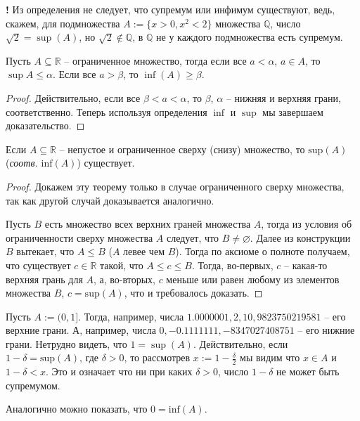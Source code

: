 \begin{mydanger}{\bf{!}}
    Из определения не следует, что супремум или инфимум существуют, ведь, скажем, для подмножества $A:= \{x>0, x^2 < 2\}$ множества $\mathbb{Q}$, число $\sqrt{2} = \sup (A)$, но $\sqrt{2} \notin \mathbb{Q}$, \ie в $\mathbb{Q}$ не у каждого подмножества есть супремум.
\end{mydanger}

\begin{lemma}\label{simple_lemma}
 Пусть $A \subseteq \mathbb{R}$ -- ограниченное множество, тогда если все $a < \alpha$, $a\in A$, то $\sup A \le \alpha.$ Если все $a > \beta$, то $\inf(A) \ge \beta$.
\end{lemma}
\begin{proof}
 Действительно, если все $\beta <a< \alpha$, то $\beta$, $\alpha$ -- нижняя и верхняя грани, соответственно. Теперь используя определения $\inf$ и $\sup$ мы завершаем доказательство.
\end{proof}



\begin{theorem}\label{W=complete}
    Если $A\subseteq \mathbb{R}$ -- непустое и ограниченное сверху (снизу) множество, то $\mathrm{sup}(A)$ (\textit{соотв.} $\mathrm{inf}(A)$) существует.
\end{theorem}
\begin{proof}
    Докажем эту теорему только в случае ограниченного сверху множества, так как другой случай доказывается аналогично.

    Пусть $B$ есть множество всех верхних граней множества $A$, тогда из условия об ограниченности сверху множества $A$ следует, что $B \ne \varnothing$. Далее из конструкции $B$ вытекает, что $A\le B$ (\ie $A$ левее чем $B$). Тогда по аксиоме о полноте получаем, что существует $c \in \mathbb{R}$ такой, что $A \le c \le B$. Тогда, во-первых, $c$ -- какая-то верхняя грань для $A$, а, во-вторых, $c$ меньше или равен  любому из элементов множества $B$, \ie $c = \mathrm{sup}(A)$, что и требовалось доказать.
\end{proof}



\begin{example}
    Пусть $A := (0,1]$. Тогда, например, числа $1.0000001, 2, 10, 9823750219581$ -- его верхние грани. А, например, числа $0, -0.1111111, -8347027408751$ -- его нижние грани.
Нетрудно видеть, что $1 = \sup(A)$. Действительно, если $1-\delta = \mathrm{sup}(A)$, где $\delta > 0$,  то рассмотрев $x:=1-\frac{\delta}{2}$ мы видим что $x\in A$ и $1-\delta < x$. Это и означает что ни при каких $\delta >0$, число $1 - \delta$ не может быть супремумом.

Аналогично можно показать, что $0 = \mathrm{inf}(A).$
\end{example}





